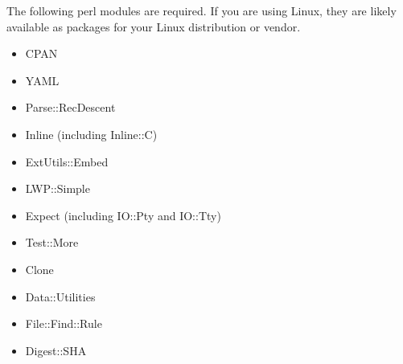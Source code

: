 \documentclass[12pt]{article}
\begin{document}
The following perl modules are required.  If you are using Linux, they
are likely available as packages for your Linux distribution or vendor.

\begin{itemize}
\item CPAN
\item YAML
\item Parse::RecDescent
\item Inline (including Inline::C)
\item ExtUtils::Embed
\item LWP::Simple
\item Expect (including IO::Pty and IO::Tty)
\item Test::More
\item Clone
\item Data::Utilities
\item File::Find::Rule
\item Digest::SHA
\end{itemize}
\end{document}
